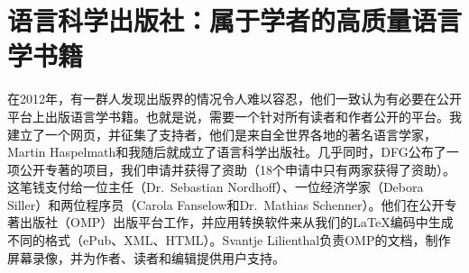 \section*{语言科学出版社：属于学者的高质量语言学书籍}

在2012年，有一群人发现出版界的情况令人难以容忍，他们一致认为有必要在公开平台上出版语言学书籍。也就是说，需要一个针对所有读者和作者公开的平台。我建立了一个网页，并征集了支持者，他们是来自全世界各地的著名语言学家，Martin Haspelmath和我随后就成立了语言科学出版社。几乎同时，DFG公布了一项公开专著的项目，我们申请\citep{MH2013a}并获得了资助（18个申请中只有两家获得了资助）。这笔钱支付给一位主任（Dr.\ Sebastian Nordhoff）、一位经济学家（Debora Siller）和两位程序员（Carola Fanselow和Dr.\ Mathias Schenner）。他们在公开专著出版社（OMP）出版平台工作，并应用转换软件来从我们的\LaTeX{}编码中生成不同的格式（ePub、XML、HTML）。Svantje Lilienthal负责OMP的文档，制作屏幕录像，并为作者、读者和编辑提供用户支持。

